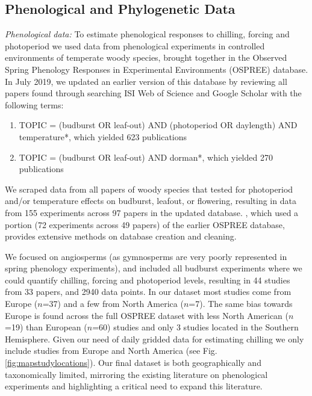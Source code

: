\documentclass[11pt]{article}
\begin{document}
\subsection*{Phenological and Phylogenetic Data}
\emph{Phenological data:} To estimate phenological responses to chilling, forcing and photoperiod we used data from phenological experiments in controlled environments of temperate woody species, brought together in the Observed Spring Phenology Responses in Experimental Environments (OSPREE) database. In July 2019, we updated an earlier version of this database \citep{wolkovich2019} by reviewing all papers found through searching ISI Web of Science and Google Scholar with the following terms: 
\begin{enumerate}
\item TOPIC = (budburst OR leaf-out) AND (photoperiod OR daylength) AND temperature*, which yielded 623 publications
\item TOPIC = (budburst OR leaf-out) AND dorman*, which yielded 270 publications
\end{enumerate}
We scraped data from all papers of woody species that tested for photoperiod and/or temperature effects on budburst, leafout, or flowering, resulting in data from 155 experiments across 97 papers in the updated database. \citet{ettinger2020}, which used a portion (72 experiments across 49 papers) of the earlier OSPREE database, provides extensive methods on  database creation and cleaning.

We focused on angiosperms (as gymnosperms are very poorly represented in spring phenology experiments), and included all budburst experiments where we could quantify chilling, forcing and photoperiod levels, resulting in 44 studies from 33 papers, and 2940 data points. 
In our dataset most studies come from Europe ($n$=37) and a few from North America ($n$=7). The same bias towards Europe is found across the full OSPREE dataset with less North American ($n$=19) than European ($n$=60) studies and only 3 studies located in the Southern Hemisphere. Given our need of daily gridded data for estimating chilling we only include studies from Europe and North America (see Fig. \ref{fig:mapstudylocations}). Our final dataset is both geographically and taxonomically limited, mirroring the existing literature on phenological experiments and highlighting a critical need to expand this literature. 
\end{document}
